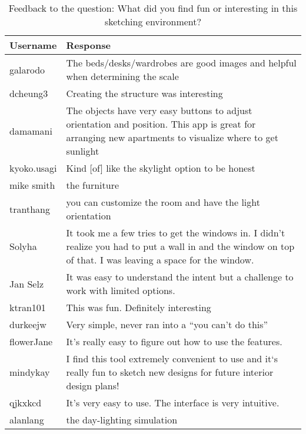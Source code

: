 \begin{table}[!ht]
\centering
\caption[What did you find fun or interesting in this sketching environment?]{Feedback to the question: What did you find fun or interesting in this sketching environment?}
\label{fig:fun}
\begin{tabular}{|p{}|p{}|}
\hline
\rowcolor[HTML]{EFEFEF} 
{\color[HTML]{000000} \textbf{Username}} & {\color[HTML]{000000} \textbf{Response}} \\ \hline
galarodo & The beds/desks/wardrobes are good images and helpful when determining the scale \\ \hline
dcheung3 & Creating the structure was interesting \\ \hline
damamani & The objects have very easy buttons to adjust orientation and position. This app is great for arranging new apartments to visualize where to get sunlight \\ \hline
kyoko.usagi & Kind {[}of{]} like the skylight option to be honest \\ \hline
mike smith & the furniture \\ \hline
tranthang & you can customize the room and have the light orientation \\ \hline
Solyha & It took me a few tries to get the windows in. I didn't realize you had to put a wall in and the window on top of that. I was leaving a space for the window. \\ \hline
Jan Selz & It was easy to understand the intent but a challenge to work with limited options. \\ \hline
ktran101 & This was fun. Definitely interesting \\ \hline
durkeejw & Very simple, never ran into a ``you can't do this'' \\ \hline
flowerJane & It's really easy to figure out how to use the features. \\ \hline
mindykay & I find this tool extremely convenient to use and it`s really fun to sketch new designs for future interior design plans! \\ \hline
qjkxkcd & It's very easy to use. The interface is very intuitive. \\ \hline
alanlang & the day-lighting simulation \\ \hline
\end{tabular}
\end{table}

